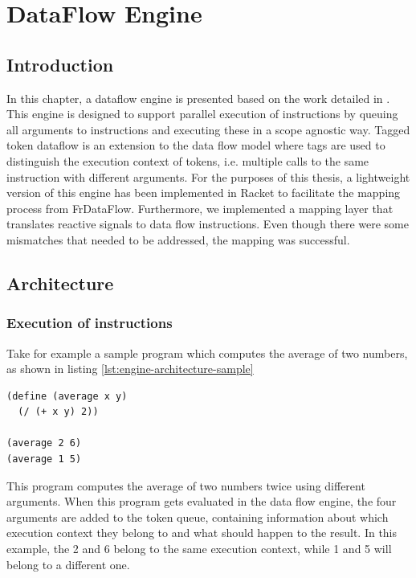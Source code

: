 \chapter{DataFlow Engine}

\section{Introduction}

In this chapter, a dataflow engine is presented based on the work detailed in \citet{saey_extensible_2017}.
This engine is designed to support parallel execution of instructions by queuing all arguments to instructions and executing these in a scope agnostic way.
Tagged token dataflow is an extension to the data flow model where tags are used to distinguish the execution context of tokens, i.e. multiple calls to the same instruction with different arguments.
For the purposes of this thesis, a lightweight version of this engine has been implemented in Racket to facilitate the mapping process from FrDataFlow. Furthermore, we implemented a mapping layer that translates reactive signals to data flow instructions. Even though there were some mismatches that needed to be addressed, the mapping was successful. 

\newpage
\section{Architecture}

\subsection{Execution of instructions}

Take for example a sample program which computes the average of two numbers, as shown in listing \ref{lst:engine-architecture-sample}

\begin{lstlisting}[caption={Computing the average of two numbers},captionpos=b,label={lst:engine-architecture-sample},language=FrDataFlow]
(define (average x y)
  (/ (+ x y) 2))
  
(average 2 6)
(average 1 5)
\end{lstlisting}

This program computes the average of two numbers twice using different arguments. When this program gets evaluated in the data flow engine, the four arguments are added to the token queue, containing information about which execution context they belong to and what should happen to the result. 
In this example, the 2 and 6 belong to the same execution context, while 1 and 5 will belong to a different one. 

